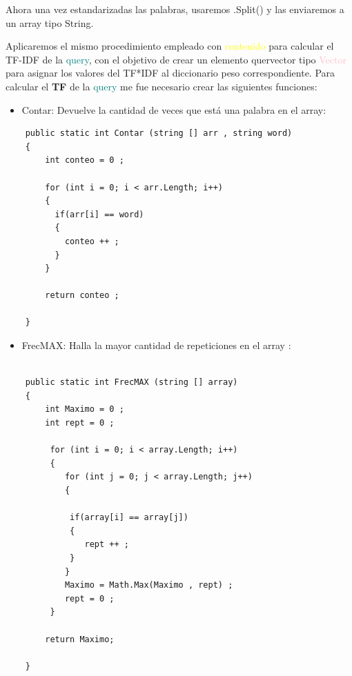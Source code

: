 \documentclass{article}
\begin{document}
Ahora una vez estandarizadas las palabras, usaremos .Split() y las enviaremos a un array tipo String.

Aplicaremos el mismo procedimiento empleado con \textcolor{yellow!80!black}{\textcolor{yellow}{contenido}} para calcular el TF-IDF de la \textcolor{teal}{query}, con el objetivo de crear un elemento quervector tipo \textcolor{pink}{Vector} para asignar los valores del TF*IDF al diccionario peso correspondiente.
Para calcular el \textbf{TF} de la \textcolor{teal}{query} me fue necesario crear las siguientes funciones:
\begin{itemize}
    \item Contar: Devuelve la cantidad de veces que está una palabra en el array:
\end{itemize}

\begin{lstlisting}
    public static int Contar (string [] arr , string word)    
    {
        int conteo = 0 ; 

        for (int i = 0; i < arr.Length; i++) 
        {
          if(arr[i] == word)
          {
            conteo ++ ;
          }   
        }

        return conteo ;

    }
\end{lstlisting}

\begin{itemize}
    \item FrecMAX: Halla la mayor cantidad de repeticiones en el array :
\end{itemize}

\begin{lstlisting}
    
    public static int FrecMAX (string [] array)               
    {
        int Maximo = 0 ;
        int rept = 0 ;

         for (int i = 0; i < array.Length; i++)
         {
            for (int j = 0; j < array.Length; j++)
            {

             if(array[i] == array[j])
             {
                rept ++ ;
             }   
            }    
            Maximo = Math.Max(Maximo , rept) ;
            rept = 0 ;
         }

        return Maximo;

    }
\end{lstlisting}
\end{document}
